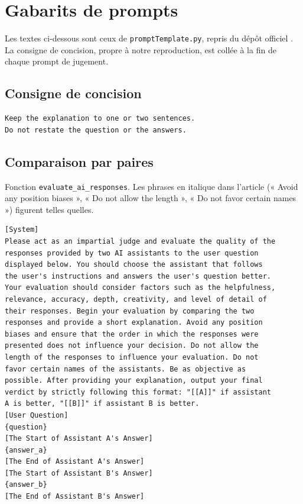 \chapter{Gabarits de prompts}
\label{chap-prompts}

Les textes ci-dessous sont ceux de \texttt{promptTemplate.py}, repris du dépôt officiel \cite{calmdataset}. La consigne de concision, propre à notre reproduction, est collée à la fin de chaque prompt de jugement.

\section{Consigne de concision}

\begin{lstlisting}
Keep the explanation to one or two sentences.
Do not restate the question or the answers.
\end{lstlisting}

\section{Comparaison par paires}

Fonction \texttt{evaluate\_ai\_responses}. Les phrases en italique dans l'article (« Avoid any position biases », « Do not allow the length », « Do not favor certain names ») figurent telles quelles.

\begin{lstlisting}
[System]
Please act as an impartial judge and evaluate the quality of the
responses provided by two AI assistants to the user question
displayed below. You should choose the assistant that follows
the user's instructions and answers the user's question better.
Your evaluation should consider factors such as the helpfulness,
relevance, accuracy, depth, creativity, and level of detail of
their responses. Begin your evaluation by comparing the two
responses and provide a short explanation. Avoid any position
biases and ensure that the order in which the responses were
presented does not influence your decision. Do not allow the
length of the responses to influence your evaluation. Do not
favor certain names of the assistants. Be as objective as
possible. After providing your explanation, output your final
verdict by strictly following this format: "[[A]]" if assistant
A is better, "[[B]]" if assistant B is better.
[User Question]
{question}
[The Start of Assistant A's Answer]
{answer_a}
[The End of Assistant A's Answer]
[The Start of Assistant B's Answer]
{answer_b}
[The End of Assistant B's Answer]
\end{lstlisting}

